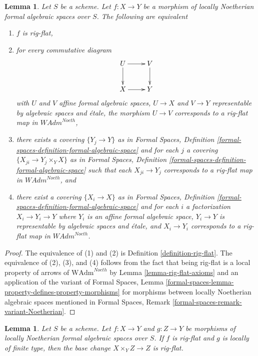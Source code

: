 \documentclass{stacks-project}
\theoremstyle{plain}
\newtheorem{lemma}[subsection]{Lemma}
\theoremstyle{definition}
\theoremstyle{remark}
\numberwithin{equation}{subsection}
\begin{document}
\begin{lemma}
\label{lemma-rig-flat-morphisms}
Let $S$ be a scheme. Let $f : X \to Y$ be a morphism of
locally Noetherian formal algebraic spaces over $S$.
The following are equivalent
\begin{enumerate}
\item $f$ is rig-flat,
\item for every commutative diagram
$$
\xymatrix{
U \ar[d] \ar[r] & V \ar[d] \\
X \ar[r] & Y
}
$$
with $U$ and $V$ affine formal algebraic spaces, $U \to X$ and $V \to Y$
representable by algebraic spaces and \'etale, the morphism $U \to V$
corresponds to a rig-flat map in $\textit{WAdm}^{Noeth}$,
\item there exists a covering $\{Y_j \to Y\}$ as in
Formal Spaces,
Definition \ref{formal-spaces-definition-formal-algebraic-space}
and for each $j$
a covering $\{X_{ji} \to Y_j \times_Y X\}$ as in
Formal Spaces,
Definition \ref{formal-spaces-definition-formal-algebraic-space}
such that each $X_{ji} \to Y_j$  corresponds
to a rig-flat map in $\textit{WAdm}^{Noeth}$, and
\item there exist a covering $\{X_i \to X\}$ as in
Formal Spaces,
Definition \ref{formal-spaces-definition-formal-algebraic-space}
and for each $i$ a factorization $X_i \to Y_i \to Y$ where $Y_i$
is an affine formal algebraic space, $Y_i \to Y$ is representable
by algebraic spaces and \'etale, and $X_i \to Y_i$ corresponds
to a rig-flat map in $\textit{WAdm}^{Noeth}$.
\end{enumerate}
\end{lemma}

\begin{proof}
The equivalence of (1) and (2) is Definition \ref{definition-rig-flat}.
The equivalence of (2), (3), and (4) follows from the fact that
being rig-flat is a local property of arrows of
$\text{WAdm}^{Noeth}$ by Lemma \ref{lemma-rig-flat-axioms}
and an application of the variant of
Formal Spaces, Lemma
\ref{formal-spaces-lemma-property-defines-property-morphisms}
for morphisms between locally Noetherian algebraic spaces
mentioned in
Formal Spaces, Remark
\ref{formal-spaces-remark-variant-Noetherian}.
\end{proof}

\begin{lemma}
\label{lemma-base-change-rig-flat}
Let $S$ be a scheme. Let $f : X \to Y$ and $g : Z \to Y$
be morphisms of locally Noetherian formal algebraic spaces over $S$.
If $f$ is rig-flat and $g$ is locally of finite type, then the base change
$X \times_Y Z \to Z$ is rig-flat.
\end{lemma}
\end{document}

